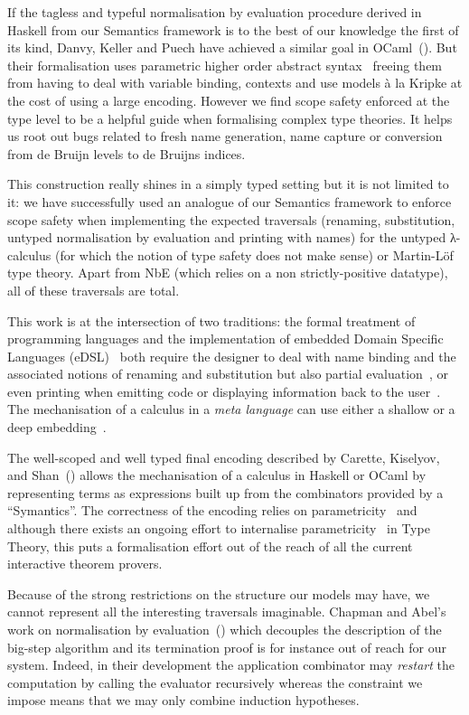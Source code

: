 If the tagless and typeful normalisation by evaluation procedure derived in Haskell
from our Semantics framework is to the best of our knowledge the first of its kind,
Danvy, Keller and Puech have achieved a similar goal in OCaml~(\citeyear{danvytagless}).
But their formalisation uses parametric higher order abstract syntax~\cite{chlipala2008parametric}
freeing them from having to deal with variable binding, contexts and use models à
la Kripke at the cost of using a large encoding. However we find scope safety
enforced at the type level to be a helpful guide when formalising complex
type theories. It helps us root out bugs related to fresh name generation,
name capture or conversion from de Bruijn levels to de Bruijns indices.

This construction really shines in a simply typed setting but it is not
limited to it: we have successfully used an analogue of our Semantics
framework to enforce scope safety when implementing the expected traversals
(renaming, substitution, untyped normalisation by evaluation and printing
with names) for the untyped λ-calculus (for which the notion of type safety
does not make sense) or Martin-Löf type theory. Apart from NbE (which relies
on a non strictly-positive datatype), all of these traversals are total.

This work is at the intersection of two traditions: the formal treatment
of programming languages and the implementation of embedded Domain Specific
Languages (eDSL)~\cite{hudak1996building} both require the designer to
deal with name binding and the associated notions of renaming and substitution
but also partial evaluation~\cite{danvy1999type}, or even printing when
emitting code or displaying information back to the user~\cite{wiedijk2012pollack}.
The mechanisation of a calculus in a \emph{meta language} can use either
a shallow or a deep embedding~\cite{svenningsson2013combining,gill2014domain}.


The well-scoped and well typed final encoding described by Carette, Kiselyov,
and Shan~(\citeyear{carette2009finally}) allows the mechanisation of a calculus in
Haskell or OCaml by representing terms as expressions built up from the
combinators provided by a ``Symantics''. The correctness of the encoding
relies on parametricity~\cite{reynolds1983types} and although there exists
an ongoing effort to internalise parametricity~\cite{bernardy2013type} in
Type Theory, this puts a formalisation effort out of the reach of all the
current interactive theorem provers.

Because of the strong restrictions on the structure our models may have,
we cannot represent all the interesting traversals imaginable. Chapman and
Abel's work on normalisation by evaluation~(\citeyear{chapman2009type,abel2014normalization})
which decouples the description of the big-step algorithm and its termination
proof is for instance out of reach for our system. Indeed, in their development
the application combinator may \emph{restart} the computation by calling the
evaluator recursively whereas the  constraint we impose means
that we may only combine induction hypotheses.

